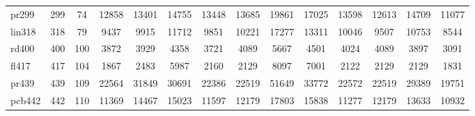 \begin{table}[htbp]
{{\begin{tabular}{|l|c|c|c|c|c|c|c|c|c|c|c|c|c|}
pr299 & 299 & 74 & 12858 & 13401 & 14755 & 13448 & 13685 & 19861 & 17025 & 13598 & 12613 & 14709 & 11077 \\
lin318 & 318 & 79 & 9437 & 9915 & 11712 & 9851 & 10221 & 17277 & 13311 & 10046 & 9507 & 10753 & 8544 \\
rd400 & 400 & 100 & 3872 & 3929 & 4358 & 3721 & 4089 & 5667 & 4501 & 4024 & 4089 & 3897 & 3091 \\
fl417 & 417 & 104 & 1867 & 2483 & 5987 & 2160 & 2129 & 8097 & 7001 & 2122 & 2129 & 2129 & 1831 \\
pr439 & 439 & 109 & 22564 & 31849 & 30691 & 22386 & 22519 & 51649 & 33772 & 22572 & 22519 & 29389 & 19751 \\
pcb442 & 442 & 110 & 11369 & 14467 & 15023 & 11597 & 12179 & 17803 & 15838 & 11277 & 12179 & 13633 & 10932 \\
\hline
\end{tabular}}}
\end{table}
